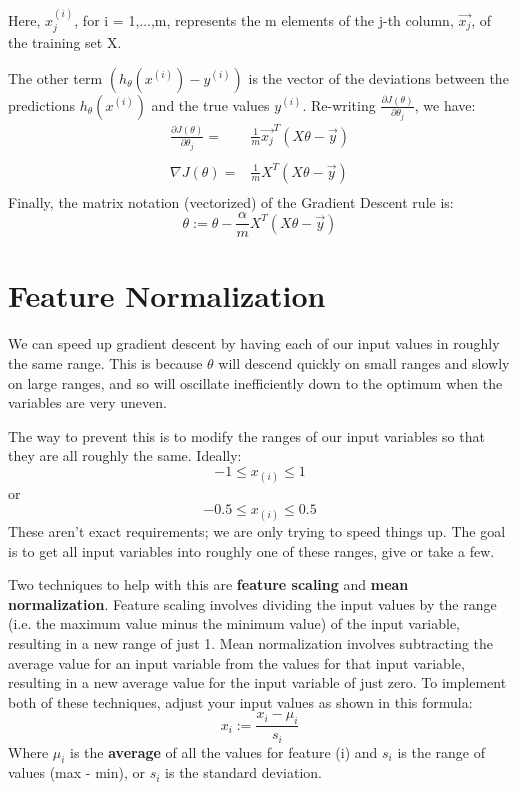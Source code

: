 Here, $x_j^{(i)} $, for i = 1,...,m, represents the m elements of the j-th column, $\vec{x_j}$, of the training set X.

The other term $\left(h_\theta(x^{(i)}) - y^{(i)} \right)$ is the vector of the deviations between the predictions $h_\theta(x^{(i)})$ and the true values $y^{(i)}$. Re-writing $\frac{\partial J(\theta)}{\partial \theta_j}$, we have:
\begin{align*}
\frac{\partial J(\theta)}{\partial \theta_j} =& \frac1m  \vec{x_j}^{T} (X\theta - \vec{y}) \\ \\
\nabla J(\theta)  =& \frac 1m X^{T} (X\theta - \vec{y}) \\
\end{align*}
Finally, the matrix notation (vectorized) of the Gradient Descent rule is:
\begin{equation}
\theta := \theta - \frac{\alpha}{m}X^T (X\theta - \vec{y})
\end{equation}
\section{Feature Normalization}
We can speed up gradient descent by having each of our input values in roughly the same range. This is because $\theta$ will descend quickly on small ranges and slowly on large ranges, and so will oscillate inefficiently down to the optimum when the variables are very uneven.

The way to prevent this is to modify the ranges of our input variables so that they are all roughly the same. Ideally:
$$-1 \leq x_{(i)} \leq 1 $$
or
$$-0.5 \leq x_{(i)}\leq 0.5 $$
These aren't exact requirements; we are only trying to speed things up. The goal is to get all input variables into roughly one of these ranges, give or take a few.

Two techniques to help with this are {\bf feature scaling} and {\bf mean normalization}. Feature scaling involves dividing the input values by the range (i.e. the maximum value minus the minimum value) of the input variable, resulting in a new range of just 1. Mean normalization involves subtracting the average value for an input variable from the values for that input variable, resulting in a new average value for the input variable of just zero. To implement both of these techniques, adjust your input values as shown in this formula:
\begin{equation}
x_i := \frac{x_i-\mu_i}{s_i}
\end{equation}
Where $\mu_i$ is the {\bf average} of all the values for feature (i) and $s_i$ is the range of values (max - min), or $s_i$ is the standard deviation.

